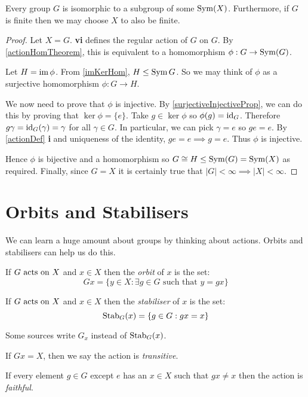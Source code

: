 \documentclass[../main.tex]{subfiles}
\begin{document}
\begin{theorem}
  Every group $G$ is isomorphic to a subgroup of some $\operatorname{Sym}(X)$.
  Furthermore, if $G$ is finite then we may choose $X$ to also be finite.
\end{theorem}
\begin{proof}
  Let $X = G$.
   \textbf{vi} defines the regular action  of $G$ on $G$.
  By \cref{actionHomTheorem}, this is equivalent to a homomorphism $\phi: G \to \operatorname{Sym}(G)$.

  Let $H = \operatorname{im} \phi$.
  From \cref{imKerHom}, $H \leq \operatorname{Sym} G$.
  So we may think of $\phi$ as a surjective homomorphism $\phi: G \to H$.

  We now need to prove that $\phi$ is injective.
  By \cref{surjectiveInjectiveProp}, we can do this by proving that $\ker \phi  = \{e\}$.
  Take $g \in \ker \phi$ so $\phi(g) = \mathrm{id}_G$.
  Therefore $g \gamma = \mathrm{id}_G(\gamma) = \gamma$ for all $\gamma \in G$.
  In particular, we can pick $\gamma = e$ so $ge = e$.
  By \cref{actionDef} \textbf{i} and uniqueness of the identity, $ge = e \implies g = e$.
  Thus $\phi$ is injective.

  Hence $\phi$ is bijective and a homomorphism so $G \cong H \leq \operatorname{Sym}(G) = \operatorname{Sym}(X)$  as required.
  Finally, since $G = X$ it is certainly true that $|G| < \infty \implies |X| < \infty$.
\end{proof}
\section{Orbits and Stabilisers}
We can learn a huge amount about groups by thinking about actions.
Orbits and stabilisers can help us do this.
\begin{definition}[Orbit]
  If $G \text{ acts on } X$ and $x \in X$ then the \textit{orbit} of $x$ is the set:
  \[
    Gx = \{y \in X : \exists g \in G \text{ such that } y = gx\}
  \]
\end{definition}
\begin{definition}[Stabiliser]
  If $G \text{ acts on } X$ and $x \in X$ then the \textit{stabiliser} of $x$ is the set:
  \[
    \operatorname{Stab}_G(x) = \{g \in G : gx = x\}
  \]
\end{definition}
\begin{remark}[Warning]
  Some sources write $G_x$ instead of $\operatorname{Stab}_G(x)$.
\end{remark}
\begin{definition}[Transitive]
  If $Gx = X$, then we say the action is \textit{transitive}.
\end{definition}
\begin{definition}[Faithful]
  If every element $g \in G$ except $e$ has an $x \in X$ such that $gx \neq x$ then the action is \textit{faithful}.
\end{definition}
\end{document}

